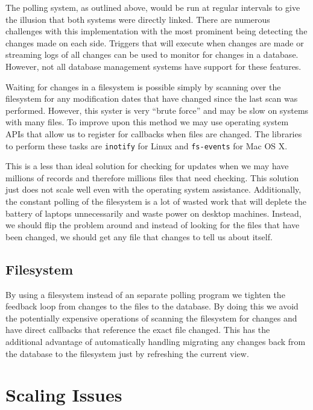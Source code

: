 The polling system, as outlined above, would be run at regular intervals to
give the illusion that both systems were directly linked. There are numerous
challenges with this implementation with the most prominent being detecting the
changes made on each side. Triggers that will execute when changes are made or
streaming logs of all changes can be used to monitor for changes in a database.
However, not all database management systems have support for these features.

Waiting for changes in a filesystem is possible simply by scanning over the
filesystem for any modification dates that have changed since the last scan was
performed. However, this syster is very ``brute force'' and may be slow on
systems with many files. To improve upon this method we may use operating
system APIs that allow us to register for callbacks when files are changed. The
libraries to perform these tasks are \texttt{inotify} for Linux and
\texttt{fs-events} for Mac OS X.

This is a less than ideal solution for checking for updates when we may have
millions of records and therefore millions files that need checking. This
solution just does not scale well even with the operating system assistance.
Additionally, the constant polling of the filesystem is a lot of wasted work
that will deplete the battery of laptops unnecessarily and waste power on
desktop machines. Instead, we should flip the problem around and instead of
looking for the files that have been changed, we should get any file that
changes to tell us about itself.

\subsection{Filesystem}

By using a filesystem instead of an separate polling program we tighten the
feedback loop from changes to the files to the database. By doing this we avoid
the potentially expensive operations of scanning the filesystem for changes and
have direct callbacks that reference the exact file changed. This has the
additional advantage of automatically handling migrating any changes back from
the database to the filesystem just by refreshing the current view.


\section{Scaling Issues}

